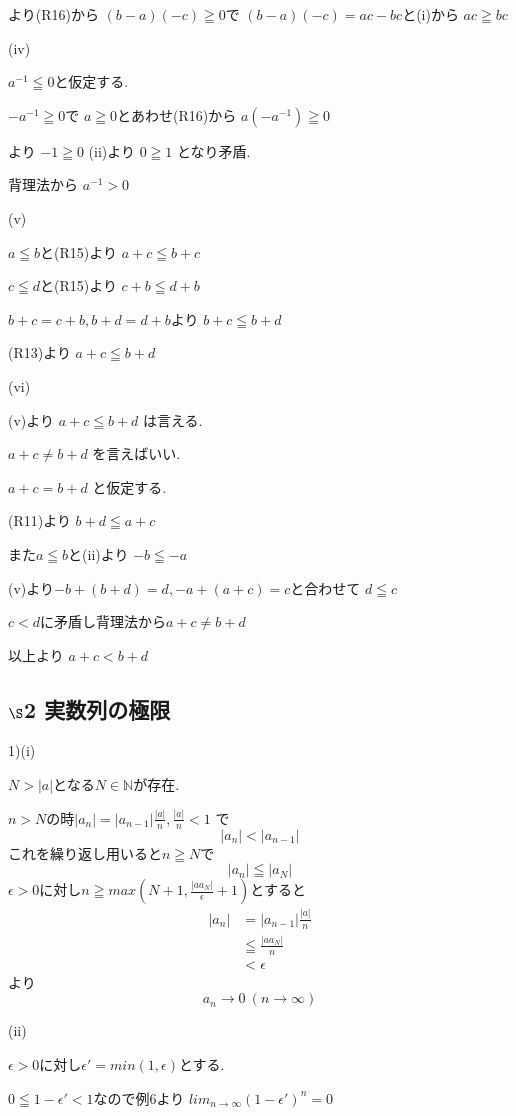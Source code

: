 \documentclass{jsarticle}
\begin{document}
より(R16)から
$(b-a)(-c)\geqq 0$で
$(b-a)(-c)=ac-bc$と(i)から
$ac\geqq bc$


(iv)

$a^{-1}\leqq 0$と仮定する.

$-a^{-1}\geqq 0$で
$a\geqq 0$とあわせ(R16)から
$a(-a^{-1})\geqq 0$

より
$-1\geqq 0$
(ii)より
$0\geqq 1$
となり矛盾.

背理法から
$a^{-1}>0$


(v)

$a\leqq b$と(R15)より
$a+c \leqq b+c$

$c\leqq d$と(R15)より
$c+b \leqq d+b$

$b+c=c+b,b+d=d+b$より
$b+c \leqq b+d$

(R13)より
$a+c\leqq b+d$


(vi)


(v)より
$a+c\leqq b+d$
は言える.

$a+c\neq b+d$
を言えばいい.

$a+c = b+d$
と仮定する.

(R11)より
$b+d\leqq a+c$

また$a\leqq b$と(ii)より
$-b\leqq -a$

(v)より$-b+(b+d)=d,-a+(a+c)=c$と合わせて
$d\leqq c$

$c<d$に矛盾し背理法から$a+c\neq b+d$


以上より
$a+c < b+d$


\subsection*{$\S$2 実数列の極限}
1)(i)

$N>|a|$となる$N\in\mathbb{N}$が存在.

$n>N$の時$|a_n| = |a_{n-1}|\frac{|a|}{n},\frac{|a|}{n}<1$ で
\[|a_n| < |a_{n-1}|\]
これを繰り返し用いると$n\geqq N$で
\[|a_n| \leqq |a_N|\]
$\epsilon > 0$に対し$n \geqq max(N+1,\frac{|aa_N|}{\epsilon}+1)$とすると
\begin{align*}
|a_n| &= |a_{n-1}|\frac{|a|}{n}\\
       &\leqq \frac{|aa_N|}{n} \\
       &< \epsilon
\end{align*}
より
\[a_n\to0 \ (n\to \infty)\]


(ii)

$\epsilon > 0$に対し$\epsilon'=min(1,\epsilon)$とする.

$0\leqq 1-\epsilon' < 1$なので例6より
$lim_{n\to \infty}(1-\epsilon')^n = 0$
\end{document}
